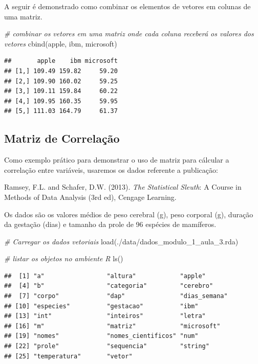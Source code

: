 \documentclass[
]{article}
\newenvironment{Shaded}{\begin{snugshade}}{\end{snugshade}}
\newcommand{\CommentTok}[1]{\textcolor[rgb]{0.56,0.35,0.01}{\textit{#1}}}
\newcommand{\FunctionTok}[1]{\textcolor[rgb]{0.00,0.00,0.00}{#1}}
\newcommand{\NormalTok}[1]{#1}
\newcommand{\StringTok}[1]{\textcolor[rgb]{0.31,0.60,0.02}{#1}}
\begin{document}
A seguir é demonstrado como combinar os elementos de vetores em colunas
de uma matriz.

\begin{Shaded}
\begin{Highlighting}[]
\CommentTok{\# combinar os vetores em uma matriz onde cada coluna receberá os valores dos vetores}
\FunctionTok{cbind}\NormalTok{(apple, ibm, microsoft)}
\end{Highlighting}
\end{Shaded}

\begin{verbatim}
##       apple    ibm microsoft
## [1,] 109.49 159.82     59.20
## [2,] 109.90 160.02     59.25
## [3,] 109.11 159.84     60.22
## [4,] 109.95 160.35     59.95
## [5,] 111.03 164.79     61.37
\end{verbatim}

\hypertarget{matriz-de-correlauxe7uxe3o}{%
\subsection{Matriz de Correlação}\label{matriz-de-correlauxe7uxe3o}}

Como exemplo prático para demonstrar o uso de matriz para cálcular a
correlação entre variáveis, usaremos os dados referente a publicação:

Ramsey, F.L. and Schafer, D.W. (2013). \emph{The Statistical Sleuth}: A
Course in Methods of Data Analysis (3rd ed), Cengage Learning.

Os dados são os valores médios de peso cerebral (g), peso corporal (g),
duração da gestação (dias) e tamanho da prole de 96 espécies de
mamíferos.

\begin{Shaded}
\begin{Highlighting}[]
\CommentTok{\# Carregar os dados vetoriais}
\FunctionTok{load}\NormalTok{(}\StringTok{\textquotesingle{}./data/dados\_modulo\_1\_aula\_3.rda\textquotesingle{}}\NormalTok{)}

\CommentTok{\# listar os objetos no ambiente R}
\FunctionTok{ls}\NormalTok{()}
\end{Highlighting}
\end{Shaded}

\begin{verbatim}
##  [1] "a"                 "altura"            "apple"            
##  [4] "b"                 "categoria"         "cerebro"          
##  [7] "corpo"             "dap"               "dias_semana"      
## [10] "especies"          "gestacao"          "ibm"              
## [13] "int"               "inteiros"          "letra"            
## [16] "m"                 "matriz"            "microsoft"        
## [19] "nomes"             "nomes_cientificos" "num"              
## [22] "prole"             "sequencia"         "string"           
## [25] "temperatura"       "vetor"
\end{verbatim}
\end{document}

